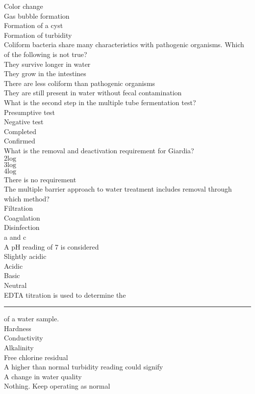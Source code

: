 Color change\\
Gas bubble formation\\
Formation of a cyst\\
Formation of turbidity\\
 Coliform bacteria share many characteristics with pathogenic organisms. Which of the following is not true?\\
They survive longer in water\\
They grow in the intestines\\
There are less coliform than pathogenic organisms\\
They are still present in water without fecal contamination\\
 What is the second step in the multiple tube fermentation test?\\
Presumptive test\\
Negative test\\
Completed\\
Confirmed\\
What is the removal and deactivation requirement for Giardia?\\
$2 \mathrm{log}$\\
$3 \mathrm{log}$\\
$4 \mathrm{log}$\\
There is no requirement\\
 The multiple barrier approach to water treatment includes removal through which method?\\
Filtration\\
Coagulation\\
Disinfection\\
a and c\\
 A pH reading of 7 is considered\\
Slightly acidic\\
Acidic\\
Basic\\
Neutral\\
EDTA titration is used to determine the \rule{2cm}{0.3pt} of a water sample.\\
Hardness\\
Conductivity\\
Alkalinity\\
Free chlorine residual\\
 A higher than normal turbidity reading could signify\\
A change in water quality\\
Nothing. Keep operating as normal\\
